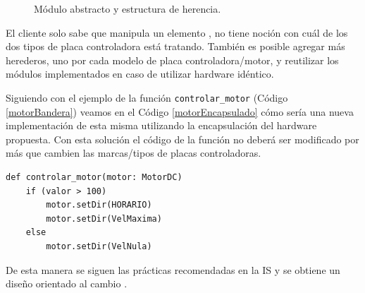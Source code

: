 \begin{figure}[H]
\caption{Módulo \MotorDC abstracto y estructura de herencia.}
\label{estructuraHerencia}
\begin{center}
\end{center}
\end{figure}

El cliente solo sabe que manipula un elemento \textit{\MotorDC}, no tiene noción con cuál de los dos tipos de placa controladora está tratando. También es posible agregar más herederos, uno por cada modelo de placa controladora/motor, y reutilizar los módulos implementados en caso de utilizar hardware idéntico.

Siguiendo con el ejemplo de la función \verb|controlar_motor| (Código \ref{motorBandera}) veamos en el Código \ref{motorEncapsulado} cómo sería una nueva implementación de esta misma utilizando la encapsulación del hardware propuesta. Con esta solución el código de la función no deberá ser modificado por más que cambien las marcas/tipos de placas controladoras.

\begin{lstlisting}[caption=Implementación de la función controlar\_motor utilizando encapsulación del hardware.,label={motorEncapsulado}]
def controlar_motor(motor: MotorDC)
    if (valor > 100)
        motor.setDir(HORARIO)
        motor.setDir(VelMaxima)
    else
        motor.setDir(VelNula)
\end{lstlisting}

De esta manera se siguen las prácticas recomendadas en la \gls{IS} \cite{ShawGarlan1996, ghezzi2003, bass2003, DBLP:books/daglib/0030743} y se obtiene un diseño orientado al cambio \cite{Gamma:1995:DPE:186897}.
\newpage

